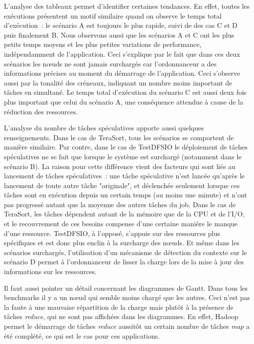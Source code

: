 L'analyse des tableaux permet d'identifier certaines tendances. En effet, toutes les exécutions présentent un motif similaire quand on observe le temps total d'exécution : le scénario A est toujours le plus rapide, suivi de des cas C et D puis finalement  B. Nous observons aussi que les scénarios A et C ont les plus petits temps moyens et les plus petites variations de performance, indépendamment de l'application. Ceci s'explique par le fait que dans ces deux scénarios les n{\oe}uds ne sont jamais surchargés car l'ordonnanceur a des informations précises au moment du démarrage de l'application. Ceci s'observe aussi par la tonalité des créneaux, indiquant un nombre moins important de tâches en simultané. Le temps total d'exécution du scénario C est aussi deux fois plus important que celui du scénario A, une conséquence attendue à cause de la réduction des ressources. 

L'analyse du nombre de tâches spéculatives apporte aussi quelques renseignements. Dans le cas de TeraSort, tous les scénarios se comportent de manière similaire. Par contre, dans le cas de TestDFSIO le déploiement de tâches spéculatives ne se fait que lorsque le système est surchargé (notamment dans le scénario B). La raison pour cette différence vient des facteurs qui sont liés au lancement de tâches spéculatives : une tâche spéculative n'est lancée qu'après le lancement de toute autre tâche "originale", et déclenchée seulement lorsque ces tâches sont en exécution depuis un certain temps (au moins une minute) et n'ont pas progressé autant que la moyenne des autres tâches du job. Dans le cas de TeraSort, les tâches dépendent autant de la mémoire que de la CPU et de l'I/O, et le recouvrement de ces besoins compense d'une certaine manière le manque d'une ressource. TestDFSIO, à l'opposé, s'appuie sur des ressources plus spécifiques et est donc plus enclin à la surcharge des n{\oe}uds. Et même dans les scénarios surchargés, l'utilisation d'un mécanisme de détection du contexte sur le scénario D permet à l'ordonnanceur de lisser la charge lors de la mise à jour des informations sur les ressources.

Il faut aussi pointer un détail concernant les diagrammes de Gantt. Dans tous les benchmarks il y a un n{\oe}ud qui semble moins chargé que les autres. Ceci n'est pas la faute à une mauvaise répartition de la charge mais plutôt à la présence de tâches \textit{reduce}, qui ne sont pas affichées dans les diagrammes. En effet, Hadoop permet le démarrage de tâches \textit{reduce} aussitôt un certain nombre de tâches \textit{map} a été complété, ce qui est le cas pour ces applications.




